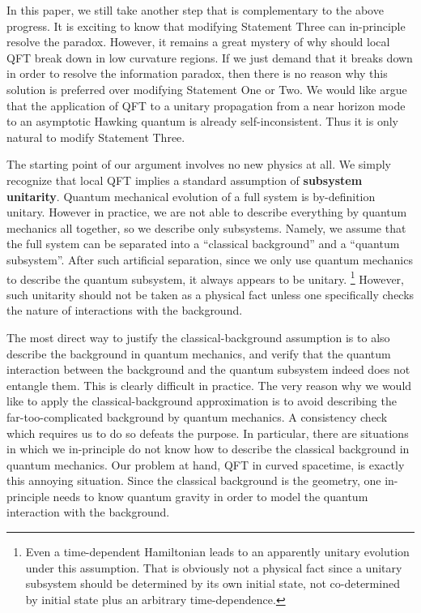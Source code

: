 \documentclass[aps,showpacs,twocolumn,floats,prd,superscriptaddress,nofootinbib]{revtex4-1}
\begin{document}
In this paper, we still take another step that is complementary to the above progress. It is exciting to know that modifying Statement Three can in-principle resolve the paradox. 
However, it remains a great mystery of why should local QFT break down in low curvature regions. 
If we just demand that it breaks down in order to resolve the information paradox, then there is no reason why this solution is preferred over modifying Statement One or Two. 
We would like argue that the application of QFT to a unitary propagation from a near horizon mode to an asymptotic Hawking quantum is already self-inconsistent. 
Thus it is only natural to modify Statement Three.

The starting point of our argument involves no new physics at all.
We simply recognize that local QFT implies a standard assumption of {\bf subsystem unitarity}.
Quantum mechanical evolution of a full system is by-definition unitary. 
However in practice, we are not able to describe everything by quantum mechanics all together, so we describe only subsystems. 
Namely, we assume that the full system can be separated into a ``classical background'' and a ``quantum subsystem''. 
After such artificial separation, since we only use quantum mechanics to describe the quantum subsystem, it always appears to be unitary.
\footnote{Even a time-dependent Hamiltonian leads to an apparently unitary evolution under this assumption. That is obviously not a physical fact since a unitary subsystem should be determined by its own initial state, not co-determined by initial state plus an arbitrary time-dependence.} 
However, such unitarity should not be taken as a physical fact unless one specifically checks the nature of interactions with the background.

The most direct way to justify the classical-background assumption is to also describe the background in quantum mechanics, and verify that the quantum interaction between the background and the quantum subsystem indeed does not entangle them. 
This is clearly difficult in practice. 
The very reason why we would like to apply the classical-background approximation is to avoid describing the far-too-complicated background by quantum mechanics. 
A consistency check which requires us to do so defeats the purpose. 
In particular, there are situations in which we in-principle do not know how to describe the classical background in quantum mechanics. 
Our problem at hand, QFT in curved spacetime, is exactly this annoying situation. 
Since the classical background is the geometry, one in-principle needs to know quantum gravity in order to model the quantum interaction with the background. 
\end{document}
